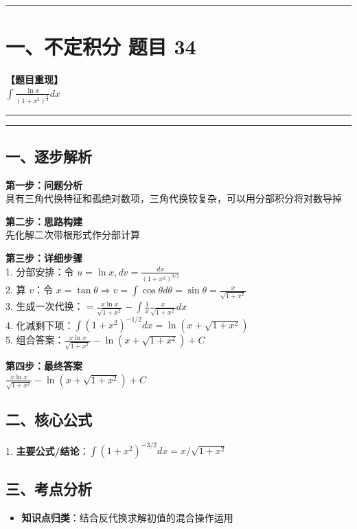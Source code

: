 ﻿\documentclass[12pt, a4paper]{ctexart}
\newcommand{\TopSeparator}{
    \par\noindent\rule{\textwidth}{1.5pt}\vspace{0.5em}
}
\newcommand{\AnalysisSeparator}{
    \par\noindent\rule{\textwidth}{0.5pt}\vspace{0.2em}\hrule\vspace{0.5em}
}
\newenvironment{RedAnalysis}{
    \par
    \color{red} 
}{
    \par
    \color{black} 
}
\begin{document}
\vspace{2em}

\TopSeparator
\section*{一、不定积分 题目 34}

\textbf{【题目重现】} \\
$\int \frac{\ln x}{(1+x^2)^{\frac{3}{2}}} dx$

\AnalysisSeparator

\begin{RedAnalysis}

	\subsection*{一、逐步解析}

	\textbf{第一步：问题分析} \\
	具有三角代换特征和孤绝对数项，三角代换较复杂，可以用分部积分将对数导掉

	\textbf{第二步：思路构建} \\
	先化解二次带根形式作分部计算

	\textbf{第三步：详细步骤} \\
	1. 分部安排：令 $u=\ln x, dv=\frac{dx}{(1+x^2)^{3/2}}$ \\ 
	2. 算 $v$：令 $x=\tan\theta \Rightarrow v = \int \cos\theta d\theta = \sin\theta = \frac{x}{\sqrt{1+x^2}}$ \\ 
	3. 生成一次代换：$= \frac{x\ln x}{\sqrt{1+x^2}} - \int \frac{1}{x} \frac{x}{\sqrt{1+x^2}} dx$ \\ 
	4. 化减剩下项：$\int (1+x^2)^{-1/2} dx = \ln(x+\sqrt{1+x^2})$ \\ 
	5. 组合答案：$\frac{x\ln x}{\sqrt{1+x^2}} - \ln(x+\sqrt{1+x^2}) + C$

	\textbf{第四步：最终答案} \\
	$\frac{x\ln x}{\sqrt{1+x^2}} - \ln(x+\sqrt{1+x^2}) + C$

	\subsection*{二、核心公式}
	1. \textbf{主要公式/结论}：$\int (1+x^2)^{-3/2} dx = x / \sqrt{1+x^2}$

	\subsection*{三、考点分析}
	\begin{itemize}
		\item \textbf{知识点归类}：结合反代换求解初值的混合操作运用
	\end{itemize}

\end{RedAnalysis}
\end{document}
